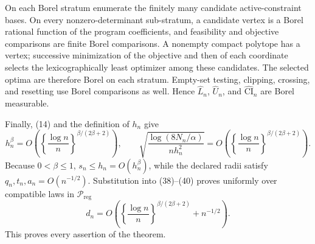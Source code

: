 On each Borel stratum enumerate the finitely many candidate active-constraint bases. On every nonzero-determinant sub-stratum, a candidate vertex is a Borel rational function of the program coefficients, and feasibility and objective comparisons are finite Borel comparisons. A nonempty compact polytope has a vertex; successive minimization of the objective and then of each coordinate selects the lexicographically least optimizer among these candidates. The selected optima are therefore Borel on each stratum. Empty-set testing, clipping, crossing, and resetting use Borel comparisons as well. Hence \(\widehat L_n\), \(\widehat U_n\), and \(\widehat{\mathrm{CI}}_n\) are Borel measurable.

Finally, (14) and the definition of \(h_n\) give
\[
 h_n^\beta
 =O\!\left(\left\{\frac{\log n}{n}\right\}^{\beta/(2\beta+2)}\right),
 \qquad
 \sqrt{\frac{\log(8N_n/\alpha)}{nh_n^2}}
 =O\!\left(\left\{\frac{\log n}{n}\right\}^{\beta/(2\beta+2)}\right). \tag{40}
\]
Because \(0<\beta\leq1\), \(s_n\leq h_n=O(h_n^\beta)\), while the declared radii satisfy \(q_n,t_n,a_n=O(n^{-1/2})\). Substitution into (38)--(40) proves uniformly over compatible laws in \(\mathcal P_{\mathrm{reg}}\)
\[
 d_n=O\!\left(\left\{\frac{\log n}{n}\right\}^{\beta/(2\beta+2)}+n^{-1/2}\right).
\]
This proves every assertion of the theorem.
